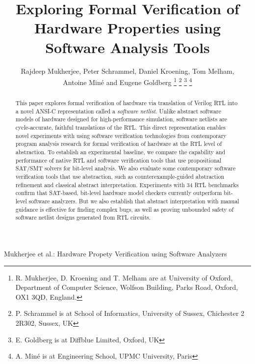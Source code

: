 \documentclass[journal]{IEEEtran}
\theoremstyle{definition}
\begin{document}
\title{Exploring Formal Verification of Hardware Properties using Software Analysis Tools}

\author{Rajdeep Mukherjee, 
        Peter Schrammel,
        Daniel Kroening, 
        Tom Melham, \\
        Antoine Min{\'e} and
        Eugene Goldberg
        \thanks{R. Mukherjee, D. Kroening and T. Melham are at 
                University of Oxford, Department of Computer Science,
                Wolfson Building, Parks Road,
                Oxford, OX1 3QD, England.}
        \thanks{P. Schrammel is at School of Informatics, University of Sussex, 
                Chichester 2 2R302, Sussex, UK}
        \thanks{E. Goldberg is at Diffblue Limited, Oxford, UK}
        \thanks{A. Min{\'e} is at Engineering School, UPMC University, Paris}}
%
         {Mukherjee et al.: Hardware Propety Verification using Software Analyzers}

\maketitle

\begin{abstract}
This paper explores formal verification of hardware via translation of Verilog RTL into a novel ANSI-C representation called a \textit{software netlist}. Unlike abstract software models of hardware designed for high-performance simulation, software netlists  are cycle-accurate, faithful translations of the RTL. This direct representation enables novel experiments with using software verification technologies from contemporary program analysis research for formal verification of hardware at the RTL level of abstraction.  To establish an experimental
baseline, we compare the capability and performance of native RTL and software verification tools
that use propositional SAT/SMT solvers for bit-level analysis. We also evaluate some contemporary software verification tools that use abstraction, such as counterexample-guided abstraction refinement and classical abstract interpretation. Experiments with 34 RTL benchmarks confirm that SAT-based, bit-level hardware model checkers currently outperform bit-level software analyzers. But we also establish that abstract interpretation  with manual guidance is effective for finding complex bugs, as well as proving 
unbounded safety of software netlist designs generated from RTL circuits.  
\end{abstract}
\end{document}
